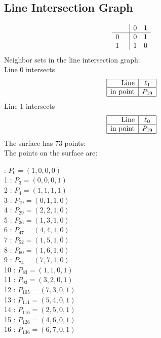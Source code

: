 \documentclass{article}
\begin{document}
{\subsection*{Line Intersection Graph}
{\arraycolsep=1pt
$$
\begin{array}{rr|*{2}r}
 &  & 0 & 1\\
\hline
0 &  & 0 & 1\\
1 &  & 1 & 0\\
\end{array}
$$
}%
Neighbor sets in the line intersection graph:\\
Line 0 intersects 
$$
\begin{array}{|r*{1}{|c}|}
\hline
\mbox{Line}  & \ell_{1}\\
\hline
\mbox{in point}  & P_{19}\\
\hline
\end{array}
$$
Line 1 intersects 
$$
\begin{array}{|r*{1}{|c}|}
\hline
\mbox{Line}  & \ell_{0}\\
\hline
\mbox{in point}  & P_{19}\\
\hline
\end{array}
$$
The surface has 73 points:\\
The points on the surface are:\\
\begin{multicols}{3}
 : $P_{0}=( 1, 0, 0, 0 )$\\
1 : $P_{3}=( 0, 0, 0, 1 )$\\
2 : $P_{4}=( 1, 1, 1, 1 )$\\
3 : $P_{19}=( 0, 1, 1, 0 )$\\
4 : $P_{29}=( 2, 2, 1, 0 )$\\
5 : $P_{36}=( 1, 3, 1, 0 )$\\
6 : $P_{47}=( 4, 4, 1, 0 )$\\
7 : $P_{52}=( 1, 5, 1, 0 )$\\
8 : $P_{60}=( 1, 6, 1, 0 )$\\
9 : $P_{74}=( 7, 7, 1, 0 )$\\
10 : $P_{83}=( 1, 1, 0, 1 )$\\
11 : $P_{93}=( 3, 2, 0, 1 )$\\
12 : $P_{105}=( 7, 3, 0, 1 )$\\
13 : $P_{111}=( 5, 4, 0, 1 )$\\
14 : $P_{116}=( 2, 5, 0, 1 )$\\
15 : $P_{126}=( 4, 6, 0, 1 )$\\
16 : $P_{136}=( 6, 7, 0, 1 )$\\

\end{multicols}}
\end{document}
